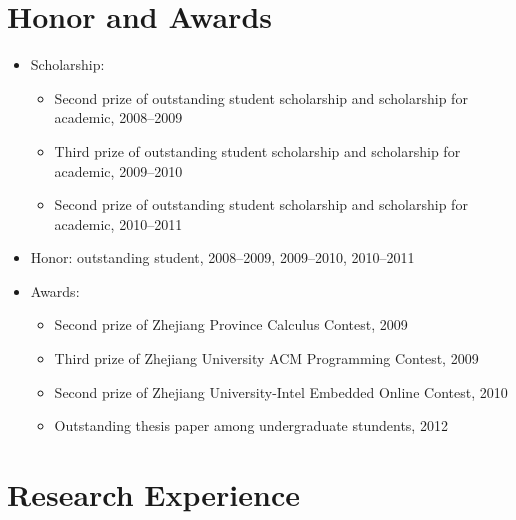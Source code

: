\documentclass[letterpaper]{article}
\begin{document}
\section*{Honor and Awards}
\begin{itemize}
\item Scholarship:
    \begin{itemize}
    \item Second prize of outstanding student scholarship and scholarship for academic, 2008--2009
    \item Third prize of outstanding student scholarship and scholarship for academic, 2009--2010
    \item Second prize of outstanding student scholarship and scholarship for academic, 2010--2011
    \end{itemize}
\item Honor: outstanding student, 2008--2009, 2009--2010, 2010--2011
\item Awards:
    \begin{itemize}
    \item Second prize of Zhejiang Province Calculus Contest, 2009
    \item Third prize of Zhejiang University ACM Programming Contest,
    2009
    \item Second prize of Zhejiang University-Intel Embedded Online Contest, 2010
    \item Outstanding thesis paper among undergraduate stundents, 2012
    \end{itemize}
\end{itemize}


\section*{Research Experience}
\end{document}
